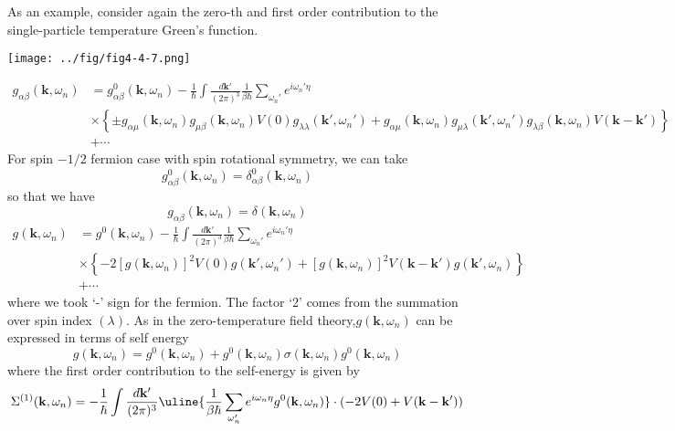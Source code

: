 As an example, consider again the zero-th and first order contribution to the single-particle temperature Green's function.
\begin{center}
\texttt{[image: ../fig/fig4-4-7.png]}
\end{center}
\begin{equation}
\begin{aligned}
g_{\alpha\beta}(\mathbf{k},\omega_n)&=g_{\alpha\beta}^0(\mathbf{k},\omega_n)-\frac{1}{\hbar}\int\frac{d\mathbf{k}'}{(2\pi)^3}\frac{1}{\beta\hbar} \sum_{\omega_n'} e^{i\omega_n'\eta}\\
&\times\left\{\pm g_{\alpha\mu}(\mathbf{k},\omega_n)g_{\mu\beta}(\mathbf{k},\omega_n) V(0) g_{\lambda\lambda}(\mathbf{k}',\omega_n')+ g_{\alpha\mu}(\mathbf{k},\omega_n) g_{\mu\lambda}(\mathbf{k}',\omega_n') g_{\lambda\beta}(\mathbf{k},\omega_n) V(\mathbf{k}-\mathbf{k}')\right\}\\
&+\cdots
\end{aligned}
\end{equation}
For spin $-1/2$ fermion case with spin rotational symmetry, we can take
\[
g_{\alpha\beta}^0(\mathbf{k},\omega_n)=\delta_{\alpha\beta}^0(\mathbf{k},\omega_n)
\]
so that we have
\[
g_{\alpha\beta}(\mathbf{k},\omega_n)=\delta(\mathbf{k},\omega_n)
\]
\begin{equation}
\begin{aligned}
g(\mathbf{k},\omega_n)&=g^0(\mathbf{k},\omega_n)-\frac{1}{\hbar}\int\frac{d\mathbf{k}'}{(2\pi)^3}\frac{1}{\beta\hbar} \sum_{\omega_n'} e^{i\omega_n'\eta}\\
&\times\left\{-2\left[g(\mathbf{k},\omega_n)\right]^2 V(0) g(\mathbf{k}',\omega_n')+ \left[g(\mathbf{k},\omega_n)\right]^2 V(\mathbf{k}-\mathbf{k}') g(\mathbf{k}',\omega_n) \right\}\\
&+\cdots
\end{aligned}
\end{equation}
where we took `-' sign for the fermion.
The factor `2' comes from the summation over spin index $(\lambda)$.
As in the zero-temperature field theory,$g(\mathbf{k},\omega_n)$ can be expressed in terms of self energy
\begin{equation}
g(\mathbf{k},\omega_n)=g^0(\mathbf{k},\omega_n)+g^0(\mathbf{k},\omega_n)\sigma (\mathbf{k},\omega_n) g^0(\mathbf{k},\omega_n)
\end{equation}
where the first order contribution to the self-energy is given by
\begin{equation}
\Sigma^{(1)}(\mathbf{k},\omega_n)=-\frac{1}{\hbar}\int \frac{d\mathbf{k}'}{(2\pi)^3} \uline{\frac{1}{\beta\hbar} \sum_{\omega_n'} e^{i\omega_n\eta} g^0(\mathbf{k},\omega_n)}\cdot\left(-2V(0)+V(\mathbf{k}-\mathbf{k}')\right)
\end{equation}
